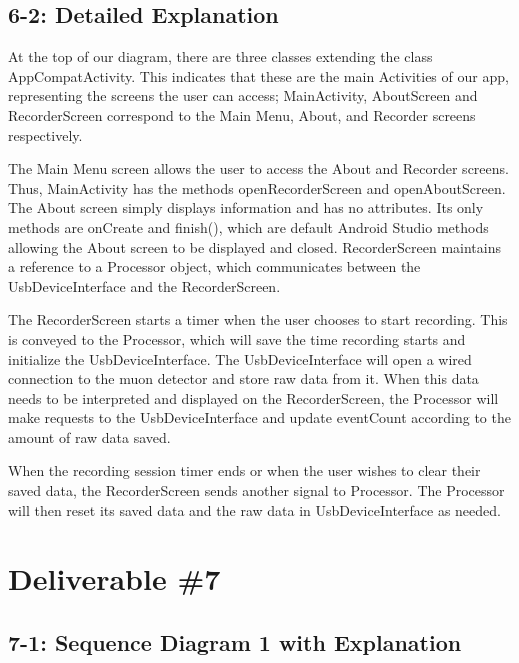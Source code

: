 \documentclass[11pt,a4paper]{article}
\begin{document}
\subsection*{6-2: Detailed Explanation}

At the top of our diagram, there are three classes extending the class AppCompatActivity. This indicates that these are the main Activities of our app, representing the screens the user can access; MainActivity, AboutScreen and RecorderScreen correspond to the Main Menu, About, and Recorder screens respectively.

The Main Menu screen allows the user to access the About and Recorder screens. Thus, MainActivity has the methods openRecorderScreen and openAboutScreen. The About screen simply displays information and has no attributes. Its only methods are onCreate and finish(), which are default Android Studio methods allowing the About screen to be displayed and closed.
RecorderScreen maintains a reference to a Processor object, which communicates between the UsbDeviceInterface and the RecorderScreen.

The RecorderScreen starts a timer when the user chooses to start recording. This is conveyed to the Processor, which will save the time recording starts and initialize the UsbDeviceInterface. The UsbDeviceInterface will open a wired connection to the muon detector and store raw data from it. When this data needs to be interpreted and displayed on the RecorderScreen, the Processor will make requests to the UsbDeviceInterface and update eventCount according to the amount of raw data saved.

When the recording session timer ends or when the user wishes to clear their saved data, the RecorderScreen sends another signal to Processor. The Processor will then reset its saved data and the raw data in UsbDeviceInterface as needed.



\newpage

\section*{Deliverable \#7}

\subsection*{7-1: Sequence Diagram 1 with Explanation}
\end{document}

